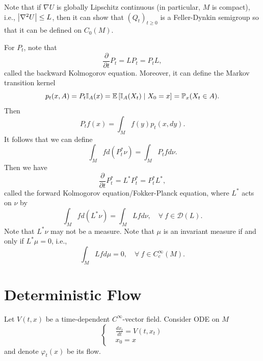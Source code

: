 \begin{rmk}
    Note that if $\nabla U$ is globally Lipschitz continuous (in particular, $M$ is compact), i.e., $\left\lvert\nabla^2 U\right\lvert \leq L$, then it can show that $(Q_t)_{t \geq 0}$ is a Feller-Dynkin semigroup so that it can be defined on $C_0(M)$.
\end{rmk}
\begin{rmk}
    For $P_t$, note that
    \begin{equation*}
        \frac{\partial}{\partial t}P_t = LP_t = P_tL,
    \end{equation*}
    called the backward Kolmogorov equation. Moreover, it can define the Markov transition kernel
    \begin{equation*}
        p_t(x,A) = P_t\mathbb{I}_A(x) = \mathbb{E}\left[\mathbb{I}_A(X_t) \mid X_0 = x\right] = \mathbb{P}_x(X_t \in A).
    \end{equation*}
    Then
    \begin{equation*}
        P_tf(x) = \int_M f(y)p_t(x,dy).
    \end{equation*}
    It follows that we can define
    \begin{equation*}
        \int_M f d(P_t^*\nu) = \int_M P_tf d\nu.
    \end{equation*}
    Then we have
    \begin{equation*}
        \frac{\partial}{\partial t}P_t^* = L^*P_t^* = P_t^*L^*,
    \end{equation*}
    called the forward Kolmogorov equation/Fokker-Planck equation, where $L^*$ acts on $\nu$ by
    \begin{equation*}
        \int_M f d(L^*\nu) = \int_M Lf d\nu,\quad \forall~f \in \mathcal{D}(L).
    \end{equation*}
    Note that $L^*\nu$ may not be a measure. Note that $\mu$ is an invariant measure if and only if $L^*\mu = 0$, i.e.,
    \begin{equation*}
        \int_M Lf d\mu = 0,\quad \forall~f \in C_c^\infty(M).
    \end{equation*}
\end{rmk}

\section{Deterministic Flow} 

Let $V(t,x)$ be a time-dependent $C^\infty$-vector field. Consider ODE on $M$
\begin{equation}\label{eq:flowODE}
    \left\{
        \begin{aligned}
            &\frac{dx_t}{dt} = V(t,x_t) \\
            &x_0 = x
        \end{aligned}
    \right.
\end{equation}
and denote $\varphi_t(x)$ be its flow.

